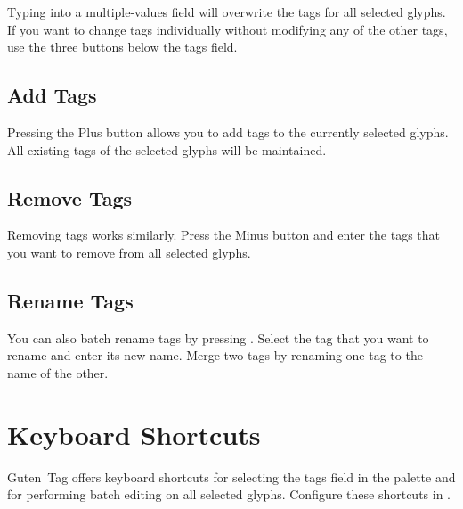\bigbreak\noindent%

\bigbreak\noindent Typing into a multiple-values field will overwrite the tags for all selected glyphs.
If you want to change tags individually without modifying any of the other tags, use the three buttons below the tags field.

\subsection{Add Tags}%
\label{sub:add_tags}

Pressing the Plus  button allows you to add tags to the currently selected glyphs.
All existing tags of the selected glyphs will be maintained.

\medbreak\noindent%

\subsection{Remove Tags}%
\label{sub:remove_tags}

Removing tags works similarly.
Press the Minus  button and enter the tags that you want to remove from all selected glyphs.

\medbreak\noindent%

\subsection{Rename Tags}%
\label{sub:rename_tags}

You can also batch rename tags by pressing .
Select the tag that you want to rename and enter its new name.
Merge two tags by renaming one tag to the name of the other.

\medbreak\noindent%

\section{Keyboard Shortcuts}%
\label{sec:keyboard-shortcuts}

Guten~Tag offers keyboard shortcuts for selecting the tags field in the palette and for performing batch editing on all selected glyphs.
Configure these shortcuts in .

